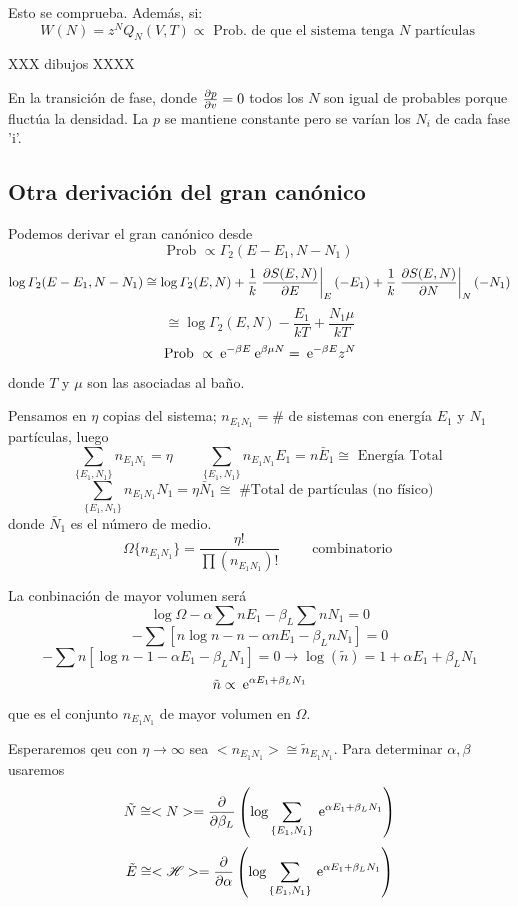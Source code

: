 \documentclass[10pt,oneside]{CBFT_book}
\begin{document}
Esto se comprueba. Además, si:
\[
	W (N) = z^N Q_N (V,T) \propto \text{ Prob. de que el sistema tenga $N$ partículas }
\]

XXX dibujos XXXX

En la transición de fase, donde $ \frac{\partial^{\hspace{-0.05em}} {p}}{\partial {v}^{\hspace{-0.05em}}} = 0  $ todos los $ N $ son igual de probables porque
fluctúa la densidad. La $p$ se mantiene constante pero se varían los $ N_i $ de cada fase 'i'.


\subsection{Otra derivación del gran canónico}

Podemos derivar el gran canónico desde 
\[
	\text{Prob } \propto \Gamma_2(E-E_1, N-N_1)
\]
\[
	\log  \Gamma_2(E-E_1, N-N_1) \cong  \log \Gamma_2( E, N ) + \frac{1}{k} \left. \frac{\partial^{\hspace{-0.05em}} {S(E,N)}}{\partial {E}^{\hspace{-0.05em}}} \right|_E(-E_1)
	+\frac{1}{k} \left. \frac{\partial^{\hspace{-0.05em}} {S(E,N)}}{\partial {N}^{\hspace{-0.05em}}} \right|_N(-N_1)
\]
\[
	\cong \log \Gamma_2( E, N ) - \frac{E_1}{kT} + \frac{N_1\mu}{kT}
\]
\[
	\text{Prob } \propto \:\mathrm{e}^{-\beta E}  \:\mathrm{e}^{\beta \mu N}  = \:\mathrm{e}^{-\beta E} z^N
\]
donde $T$ y $\mu$ son las asociadas al baño.

Pensamos en $\eta$ copias del sistema; $n_{E_1N_1} = \# $ de sistemas con energía $E_1$ y $N_1$ partículas,
luego 
\[
	\sum_{\{ E_1, N_1 \}} n_{E_1N_1} = \eta \qquad \sum_{\{ E_1, N_1 \}} n_{E_1N_1}E_1 = n\bar{E}_1 \cong 
	\text{ Energía Total }
\]
\[
	\sum_{\{ E_1, N_1 \}} n_{E_1N_1} N_1 = \eta \bar{N}_1 \cong \text{ \# Total de partículas (no físico) }
\]
donde $ \bar{N}_1 $ es el número de medio.
\[
	\Omega\{ n_{E_1N_1} \} = \frac{\eta !}{\prod (n_{E_1N_1})!} \qquad \text{ combinatorio }
\]

La conbinación de mayor volumen será 
\[
	\log \Omega - \alpha \sum n E_1 - \beta_L \sum n N_1 = 0
\]
\[
	-\sum \left[ n\log n - n - \alpha n E_1 - \beta_L n N_1 \right] = 0
\]
\[
	-\sum n \left[ \log n - 1 - \alpha E_1 - \beta_L N_1 \right] = 0 
	\rightarrow \log(\tilde{n}) = 1 + \alpha E_1 + \beta_L N_1
\]
\[
	\tilde{n} \propto \:\mathrm{e}^{\alpha E_1 + \beta_L N_1}
\]
que es el conjunto $n_{E_1N_1}$ de mayor volumen en $ \Omega $.

Esperaremos qeu con $ \eta\to\infty $ sea $<n_{E_1N_1}> \cong \tilde{n}_{E_1N_1} $.
Para determinar $\alpha, \beta$ usaremos 
\[
	\tilde{N} \cong <N> = \frac{\partial^{\hspace{-0.05em}} {}}{\partial {\beta_L}^{\hspace{-0.05em}}}\left( \log \sum_{\{ E_1, N_1 \}} 
	\:\mathrm{e}^{\alpha E_1 + \beta_L N_1} \right)
\]
\[
	\tilde{E} \cong <\mathscr{H}> =  \frac{\partial^{\hspace{-0.05em}} {}}{\partial {\alpha}^{\hspace{-0.05em}}}\left( \log \sum_{\{ E_1, N_1 \}}
	\:\mathrm{e}^{\alpha E_1 + \beta_L N_1} \right)
\]
\end{document}
